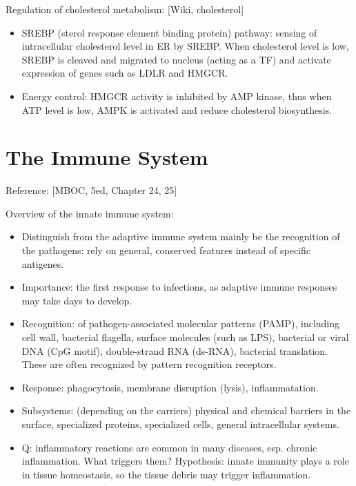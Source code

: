 \documentclass{report}
\begin{document}
\begin{enumerate}
Regulation of cholesterol metabolism: [Wiki, cholesterol]
\begin{itemize}
\item SREBP (sterol response element binding protein) pathway: sensing of intracellular cholesterol level in ER by SREBP. When cholesterol level is low, SREBP is cleaved and migrated to nucleus (acting as a TF) and activate expression of genes such as LDLR and HMGCR. 

\item Energy control: HMGCR activity is inhibited by AMP kinase, thus when ATP level is low, AMPK is activated and reduce cholesterol biosynthesis. 
\end{itemize}

\end{enumerate}
\section{The Immune System}
Reference: [MBOC, 5ed, Chapter 24, 25]

Overview of the innate immune system: 
\begin{itemize}
\item Distinguish from the adaptive immune system mainly be the recognition of the pathogens: rely on general, conserved features instead of specific antigenes. 
\item Importance: the first response to infections, as adaptive immune responses may take days to develop. 
\item Recognition: of pathogen-associated molecular patterns (PAMP), including cell wall, bacterial flagella, surface molecules (such as LPS), bacterial or viral DNA (CpG motif), double-strand RNA (ds-RNA), bacterial translation. These are often recognized by pattern recognition receptors. 
\item Response: phagocytosis, membrane disruption (lysis), inflammatation. 
\item Subsystems: (depending on the carriers) physical and chemical barriers in the surface, specialized proteins, specialized cells, general intracellular systems. 
\item Q: inflammatory reactions are common in many diseases, esp. chronic inflammation. What triggers them? Hypothesis: innate immunity plays a role in tissue homeostasis, so the tissue debris may trigger inflammation. 
\end{itemize}
\end{document}
